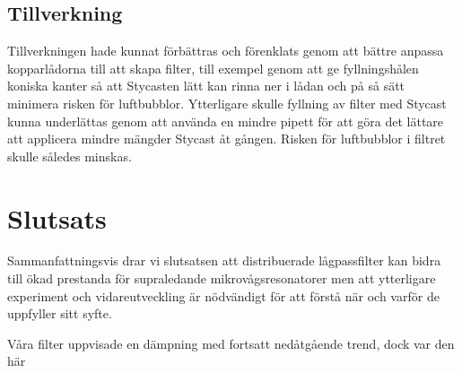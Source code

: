 \documentclass[main.tex]{subfiles}
\begin{document}
\subsection{Tillverkning}
Tillverkningen hade kunnat förbättras och förenklats genom att bättre anpassa kopparlådorna till att skapa filter, till exempel genom att ge fyllningshålen koniska kanter så att Stycasten lätt kan rinna ner i lådan och på så sätt minimera risken för luftbubblor. Ytterligare skulle fyllning av filter med Stycast kunna underlättas genom att använda en mindre pipett för att göra det lättare att applicera mindre mängder Stycast åt gången. Risken för luftbubblor i filtret skulle således minskas.

\section{Slutsats}
Sammanfattningsvis drar vi slutsatsen att distribuerade lågpassfilter kan bidra till ökad prestanda för supraledande mikrovågsresonatorer men att ytterligare experiment och vidareutveckling är nödvändigt för att förstå när och varför de uppfyller sitt syfte. 


Våra filter uppvisade en dämpning med fortsatt nedåtgående trend, dock var den här 
\end{document}
